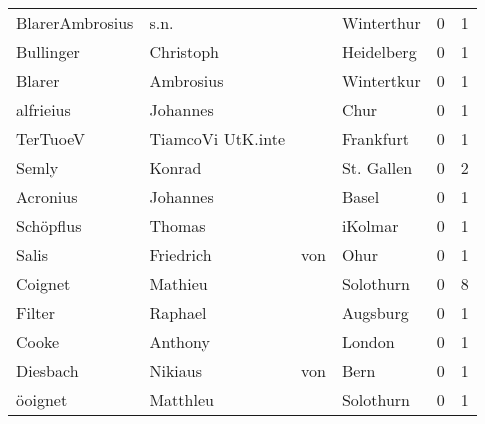 \begin{center}
\begin{tiny}
\begin{longtabu}{llllrr}
          BlarerAmbrosius &                               s.n. &             &                                  Winterthur &          0 &         1 \\
                Bullinger &                          Christoph &             &                                  Heidelberg &          0 &         1 \\
                   Blarer &                          Ambrosius &             &                                  Wintertkur &          0 &         1 \\
                alfrieius &                           Johannes &             &                                        Chur &          0 &         1 \\
                 TerTuoeV &                  TiamcoVi UtK.inte &             &                                   Frankfurt &          0 &         1 \\
                    Semly &                             Konrad &             &                                  St. Gallen &          0 &         2 \\
                 Acronius &                           Johannes &             &                                       Basel &          0 &         1 \\
                Schöpflus &                             Thomas &             &                                     iKolmar &          0 &         1 \\
                    Salis &                          Friedrich &         von &                                        Ohur &          0 &         1 \\
                  Coignet &                            Mathieu &             &                                   Solothurn &          0 &         8 \\
                   Filter &                            Raphael &             &                                    Augsburg &          0 &         1 \\
                    Cooke &                            Anthony &             &                                      London &          0 &         1 \\
                 Diesbach &                            Nikiaus &         von &                                        Bern &          0 &         1 \\
                  öoignet &                           Matthleu &             &                                   Solothurn &          0 &         1 \\

\end{longtabu}
\end{tiny}
\end{center}
